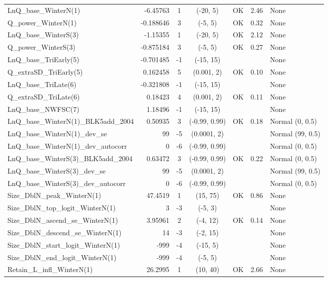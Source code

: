 \documentclass[12pt,]{article}
\begin{document}
\begin{landscape}
\begin{longtable}{lrcccll}
  LnQ\_base\_WinterN(1) & -6.45763 & 1 & (-20, 5) & OK & 2.46 & None \\ 
  Q\_power\_WinterN(1) & -0.188646 & 3 & (-5, 5) & OK & 0.32 & None \\ 
  LnQ\_base\_WinterS(3) & -1.15355 & 1 & (-20, 5) & OK & 2.12 & None \\ 
  Q\_power\_WinterS(3) & -0.875184 & 3 & (-5, 5) & OK & 0.27 & None \\ 
  LnQ\_base\_TriEarly(5) & -0.701485 & -1 & (-15, 15) &  &  & None \\ 
  Q\_extraSD\_TriEarly(5) & 0.162458 & 5 & (0.001, 2) & OK & 0.10 & None \\ 
  LnQ\_base\_TriLate(6) & -0.321808 & -1 & (-15, 15) &  &  & None \\ 
  Q\_extraSD\_TriLate(6) & 0.18423 & 4 & (0.001, 2) & OK & 0.11 & None \\ 
  LnQ\_base\_NWFSC(7) & 1.18496 & -1 & (-15, 15) &  &  & None \\ 
  LnQ\_base\_WinterN(1)\_BLK5add\_2004 & 0.50935 & 3 & (-0.99, 0.99) & OK & 0.18 & Normal (0, 0.5) \\ 
  LnQ\_base\_WinterN(1)\_dev\_se & 99 & -5 & (0.0001, 2) &  &  & Normal (99, 0.5) \\ 
  LnQ\_base\_WinterN(1)\_dev\_autocorr & 0 & -6 & (-0.99, 0.99) &  &  & Normal (0, 0.5) \\ 
  LnQ\_base\_WinterS(3)\_BLK5add\_2004 & 0.63472 & 3 & (-0.99, 0.99) & OK & 0.22 & Normal (0, 0.5) \\ 
  LnQ\_base\_WinterS(3)\_dev\_se & 99 & -5 & (0.0001, 2) &  &  & Normal (99, 0.5) \\ 
  LnQ\_base\_WinterS(3)\_dev\_autocorr & 0 & -6 & (-0.99, 0.99) &  &  & Normal (0, 0.5) \\ 
  Size\_DblN\_peak\_WinterN(1) & 47.4519 & 1 & (15, 75) & OK & 0.86 & None \\ 
  Size\_DblN\_top\_logit\_WinterN(1) & 3 & -3 & (-5, 3) &  &  & None \\ 
  Size\_DblN\_ascend\_se\_WinterN(1) & 3.95961 & 2 & (-4, 12) & OK & 0.14 & None \\ 
  Size\_DblN\_descend\_se\_WinterN(1) & 14 & -3 & (-2, 15) &  &  & None \\ 
  Size\_DblN\_start\_logit\_WinterN(1) & -999 & -4 & (-15, 5) &  &  & None \\ 
  Size\_DblN\_end\_logit\_WinterN(1) & -999 & -4 & (-5, 5) &  &  & None \\ 
  Retain\_L\_infl\_WinterN(1) & 26.2995 & 1 & (10, 40) & OK & 2.66 & None \\ 

\end{longtable}
\end{landscape}
\end{document}
